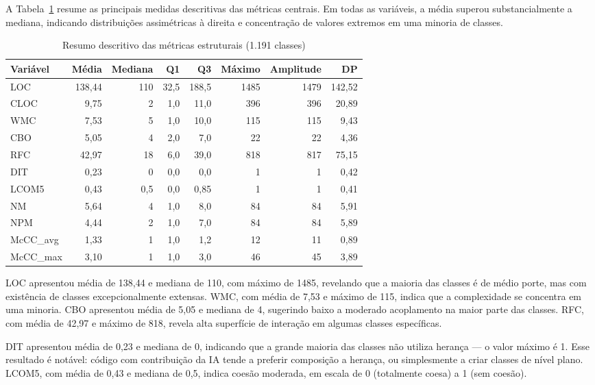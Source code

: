 \documentclass[12pt]{article}
\begin{document}
A Tabela~\ref{tab:desc} resume as principais medidas descritivas das métricas centrais. Em todas as variáveis, a média superou substancialmente a mediana, indicando distribuições assimétricas à direita e concentração de valores extremos em uma minoria de classes.

\begin{table}[H]
\centering
\caption{Resumo descritivo das métricas estruturais (1.191 classes)}
\label{tab:desc}
\small
\begin{tabular}{lrrrrrrr}
\toprule
Variável & Média & Mediana & Q1 & Q3 & Máximo & Amplitude & DP \\
\midrule
LOC      & 138,44 & 110 &  32,5 & 188,5 & 1485 & 1479 & 142,52 \\
CLOC     &   9,75 &   2 &   1,0 &  11,0 &  396 &  396 &  20,89 \\
WMC      &   7,53 &   5 &   1,0 &  10,0 &  115 &  115 &   9,43 \\
CBO      &   5,05 &   4 &   2,0 &   7,0 &   22 &   22 &   4,36 \\
RFC      &  42,97 &  18 &   6,0 &  39,0 &  818 &  817 &  75,15 \\
DIT      &   0,23 &   0 &   0,0 &   0,0 &    1 &    1 &   0,42 \\
LCOM5    &   0,43 &  0,5 &  0,0 &  0,85 &    1 &    1 &   0,41 \\
NM       &   5,64 &   4 &   1,0 &   8,0 &   84 &   84 &   5,91 \\
NPM      &   4,44 &   2 &   1,0 &   7,0 &   84 &   84 &   5,89 \\
McCC\_avg &   1,33 &   1 &   1,0 &   1,2 &   12 &   11 &   0,89 \\
McCC\_max &   3,10 &   1 &   1,0 &   3,0 &   46 &   45 &   3,89 \\
\bottomrule
\end{tabular}
\end{table}

LOC apresentou média de 138,44 e mediana de 110, com máximo de 1485, revelando que a maioria das classes é de médio porte, mas com existência de classes excepcionalmente extensas. WMC, com média de 7,53 e máximo de 115, indica que a complexidade se concentra em uma minoria. CBO apresentou média de 5,05 e mediana de 4, sugerindo baixo a moderado acoplamento na maior parte das classes. RFC, com média de 42,97 e máximo de 818, revela alta superfície de interação em algumas classes específicas.

DIT apresentou média de 0,23 e mediana de 0, indicando que a grande maioria das classes não utiliza herança — o valor máximo é 1. Esse resultado é notável: código com contribuição da IA tende a preferir composição a herança, ou simplesmente a criar classes de nível plano. LCOM5, com média de 0,43 e mediana de 0,5, indica coesão moderada, em escala de 0 (totalmente coesa) a 1 (sem coesão).
\end{document}

